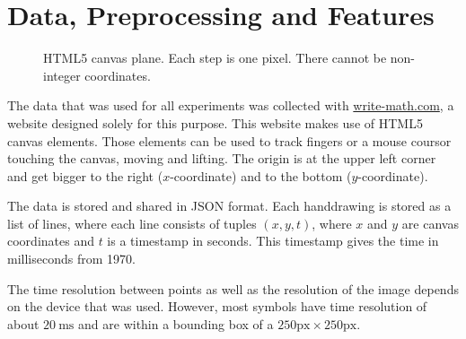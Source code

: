\chapter{Data, Preprocessing and Features}\label{ch:preprocessing}

\begin{wrapfigure}{r}{7cm}
  \vspace{-35pt}
  \begin{center}
    \newcommand*{\xMin}{0}%
    \newcommand*{\xMax}{6}%
    \newcommand*{\yMin}{0}%
    \newcommand*{\yMax}{6}%
  \end{center}
  \vspace{-20pt}
  \caption{HTML5 canvas plane. Each step is one pixel. There cannot be non-integer
           coordinates.}
  \label{fig:canvas-plane}
  \vspace{-10pt}
\end{wrapfigure}

The data that was used for all experiments was collected with
\href{http://write-math.com}{write-math.com}, a website designed solely for
this purpose. This website makes use of HTML5 canvas elements. Those elements
can be used to track fingers or a mouse coursor touching the canvas, moving
and lifting. The origin is at the upper left corner and get bigger to the right
($x$-coordinate) and to the bottom ($y$-coordinate).

The data is stored and shared in JSON format. Each handdrawing is stored as a
list of lines, where each line consists of tuples $(x, y, t)$, where $x$ and
$y$ are canvas coordinates and $t$ is a timestamp in seconds. This timestamp
gives the time in milliseconds from 1970.

The time resolution between points as well as the resolution of the image
depends on the device that was used. However, most symbols have time resolution
of about $\SI{20}{\milli\second}$ and are within a bounding box of a
$250 \text{px} \times 250 \text{px}$.

